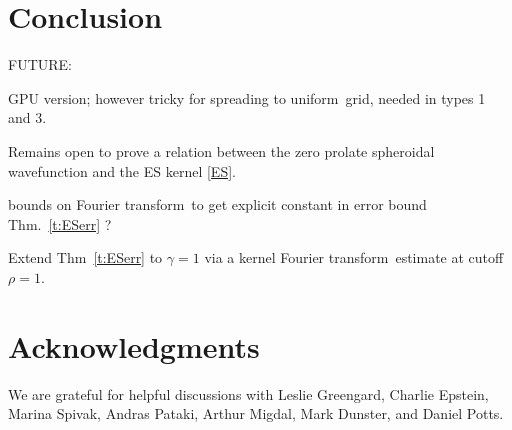 \documentclass[10pt]{article}
\newcommand{\U}{{uniform}}
\newcommand{\FT}{Fourier transform}
\begin{document}
\section{Conclusion}




FUTURE:

GPU version; however tricky for spreading to \U\ grid, needed in types 1 and 3.

Remains open to prove a relation between the zero prolate spheroidal
wavefunction and the ES kernel \eqref{ES}.

bounds on \FT\ to get
explicit constant in error bound Thm.~\ref{t:ESerr} ?

Extend Thm~\ref{t:ESerr} to $\gamma=1$ via a kernel \FT\ estimate at cutoff
$\rho=1$.


\section*{Acknowledgments}

We are grateful for helpful discussions with Leslie Greengard,
Charlie Epstein, Marina Spivak, Andras Pataki, Arthur Migdal,
Mark Dunster, and Daniel Potts.




\end{document}
